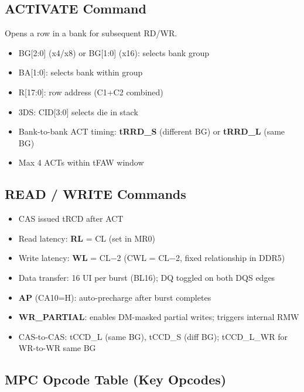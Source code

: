 \documentclass[10pt,a4paper,twoside]{article}
\begin{document}
\subsection{ACTIVATE Command}

Opens a row in a bank for subsequent RD/WR.
\begin{itemize}
  \item BG[2:0] (x4/x8) or BG[1:0] (x16): selects bank group
  \item BA[1:0]: selects bank within group
  \item R[17:0]: row address (C1+C2 combined)
  \item 3DS: CID[3:0] selects die in stack
  \item Bank-to-bank ACT timing: \textbf{tRRD\_S} (different BG) or \textbf{tRRD\_L} (same BG)
  \item Max 4 ACTs within tFAW window
\end{itemize}

\subsection{READ / WRITE Commands}

\begin{itemize}
  \item CAS issued tRCD after ACT
  \item Read latency: \textbf{RL} = CL (set in MR0)
  \item Write latency: \textbf{WL} = CL$-$2 (CWL = CL$-$2, fixed relationship in DDR5)
  \item Data transfer: 16 UI per burst (BL16); DQ toggled on both DQS edges
  \item \textbf{AP} (CA10=H): auto-precharge after burst completes
  \item \textbf{WR\_PARTIAL}: enables DM-masked partial writes; triggers internal RMW
  \item CAS-to-CAS: tCCD\_L (same BG), tCCD\_S (diff BG); tCCD\_L\_WR for WR-to-WR same BG
\end{itemize}

\subsection{MPC Opcode Table (Key Opcodes)}
\end{document}
